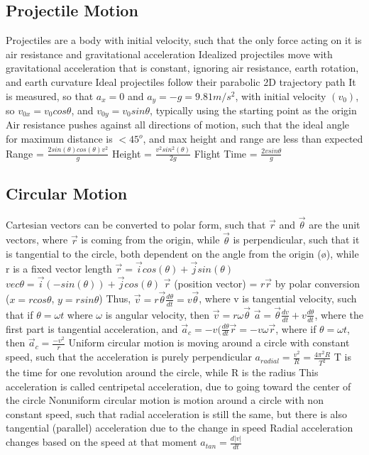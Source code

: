 \documentclass[11 pt, twoside]{article}
\newenvironment{outline*}
{
	\begin{outline}[enumerate]
	}
	{\end{outline}
}
\begin{document}
\subsection{Projectile Motion}
\begin{outline*}
\1 Projectiles are a body with initial velocity, such that the only force acting on it is air resistance and gravitational acceleration
\1 Idealized projectiles move with gravitational acceleration that is constant, ignoring air resistance, earth rotation, and earth curvature
\2 Ideal projectiles follow their parabolic 2D trajectory path
\1 It is measured, so that $a_x = 0$ and $a_y = -g = 9.81 m/s^2$, with initial velocity $(v_0)$, so $v_{0x} = v_0cos\theta$, and $v_{0y} = v_0sin\theta$, typically using the starting point as the origin
\1 Air resistance pushes against all directions of motion, such that the ideal angle for maximum distance is $<45^o$, and max height and range are less than expected
\1 Range = $\frac{2sin(\theta)cos(\theta)v^2}{g}$
\1 Height = $\frac{v^2sin^2(\theta)}{2g}$
\1 Flight Time = $\frac{2vsin\theta}{g}$
\end{outline*}
\subsection{Circular Motion}
\begin{outline*}
\1 Cartesian vectors can be converted to polar form, such that $\vec{r}$ and $\vec{\theta}$ are the unit vectors, where $\vec{r}$ is coming from the origin, while $\vec{\theta}$ is perpendicular, such that it is tangential to the circle, both dependent on the angle from the origin (ø), while r is a fixed vector length
\2 $\vec{r} = \vec{i}cos(\theta) + \vec{j}sin(\theta)$
\2 $vec{\theta} = \vec{i}(-sin(\theta)) + \vec{j}cos(\theta)$
\2 $\vec{r}$ (position vector) = $r\vec{r}$ by polar conversion ($x = rcos\theta$, $y = rsin\theta$)
\2 Thus, $\vec{v} = r\vec{\theta}\frac{d\theta}{dt} = v\vec{\theta}$, where v is tangential velocity, such that if $\theta = \omega t$ where $\omega$ is angular velocity, then $\vec{v} = r\omega\vec{\theta}$
\2 $\vec{a} = \vec{\theta}\frac{dv}{dt} + v\frac{d\theta}{dt}$, where the first part is tangential acceleration, and $\vec{a}_c = -v(\frac{d\theta}{dt}\vec{r} = -v\omega\vec{r}$, where if $\theta = \omega t$, then $\vec{a}_c = \frac{-v^2}{r}$
\1 Uniform circular motion is moving around a circle with constant speed, such that the acceleration is purely perpendicular
\1 $a_{radial} = \frac{v^2}{R} = \frac{4\pi^2R}{T^2}$
\2 T is the time for one revolution around the circle, while R is the radius
\2 This acceleration is called centripetal acceleration, due to going toward the center of the circle
\1 Nonuniform circular motion is motion around a circle with non constant speed, such that radial acceleration is still the same, but there is also tangential (parallel) acceleration due to the change in speed
\2 Radial acceleration changes based on the speed at that moment
\2 $a_{tan} = \frac{d|v|}{dt}$
\end{outline*}
\end{document}
